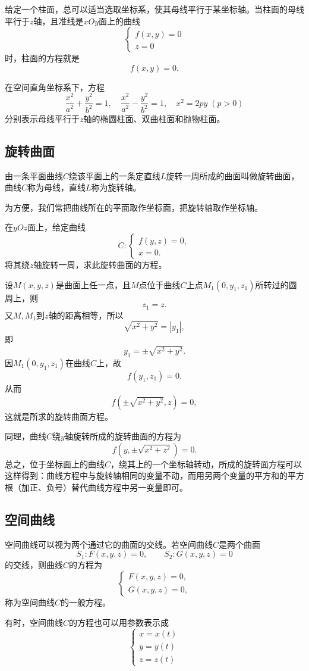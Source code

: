 给定一个柱面，总可以适当选取坐标系，使其母线平行于某坐标轴。当柱面的母线平行于$z$轴，且准线是$xOy$面上的曲线
\[
\begin{cases}
f(x,y)=0\\
z=0
\end{cases}
\]
时，柱面的方程就是
\[
f(x,y)=0.
\]

在空间直角坐标系下，方程
\[
\frac{x^2}{a^2}+\frac{y^2}{b^2}=1,\quad
\frac{x^2}{a^2}-\frac{y^2}{b^2}=1,\quad
x^2=2py\;(p>0)
\]
分别表示母线平行于$z$轴的椭圆柱面、双曲柱面和抛物柱面。

\subsection{旋转曲面}
由一条平面曲线$C$绕该平面上的一条定直线$L$旋转一周所成的曲面叫做旋转曲面，曲线$C$称为母线，直线$L$称为旋转轴。

为方便，我们常把曲线所在的平面取作坐标面，把旋转轴取作坐标轴。

在$yOz$面上，给定曲线
\[
C:
\begin{cases}
f(y, z) = 0, \\
x = 0.
\end{cases}
\]
将其绕$z$轴旋转一周，求此旋转曲面的方程。

设$M(x, y, z)$是曲面上任一点，且$M$点位于曲线$C$上点$M_1(0, y_1, z_1)$所转过的圆周上，则
\[
z_1 = z.
\]
又$M, M_1$到$z$轴的距离相等，所以
\[
\sqrt{x^2 + y^2} = |y_1|,
\]
即
\[
y_1 = \pm \sqrt{x^2 + y^2}.
\]
因$M_1(0, y_1, z_1)$在曲线$C$上，故
\[
f(y_1, z_1) = 0.
\]
从而
\[
f(\pm \sqrt{x^2 + y^2}, z) = 0,
\]
这就是所求的旋转曲面方程。

同理，曲线$C$绕$y$轴旋转所成的旋转曲面的方程为
\[
f(y, \pm \sqrt{x^2 + z^2}) = 0.
\]
总之，位于坐标面上的曲线$C$，绕其上的一个坐标轴转动，所成的旋转面方程可以这样得到：曲线方程中与旋转轴相同的变量不动，而用另两个变量的平方和的平方根（加正、负号）替代曲线方程中另一变量即可。

\subsection{空间曲线}
空间曲线可以视为两个通过它的曲面的交线。若空间曲线$C$是两个曲面
\[
S_1:F(x,y,z)=0,\qquad S_2:G(x,y,z)=0
\]
的交线，则曲线$C$的方程为
\[
\begin{cases}
F(x,y,z)=0,\\
G(x,y,z)=0,
\end{cases}
\]
称为空间曲线$C$的一般方程。

有时，空间曲线$C$的方程也可以用参数表示成
\[
\begin{cases}
x=x(t)\\
y=y(t)\\
z=z(t)
\end{cases}
\]

